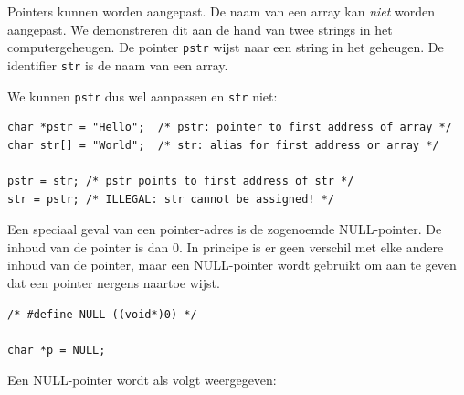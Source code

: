 \documentclass[a4paper,10pt,fleqn,twoside]{article}
\begin{document}
Pointers kunnen worden aangepast. De naam van een array kan \textsl{niet} worden aangepast. We demonstreren dit aan de hand van twee strings in het computergeheugen. De pointer \lstinline|pstr| wijst naar een string in het geheugen. De identifier \lstinline|str| is de naam van een array.

\begin{figure}[!ht]
\centering
{}
\end{figure}

We kunnen \lstinline|pstr| dus wel aanpassen en \lstinline|str| niet:

\begin{lstlisting}
char *pstr = "Hello";  /* pstr: pointer to first address of array */
char str[] = "World";  /* str: alias for first address or array */

pstr = str; /* pstr points to first address of str */
str = pstr; /* ILLEGAL: str cannot be assigned! */
\end{lstlisting}

Een speciaal geval van een pointer-adres is de zogenoemde NULL-pointer. De inhoud van de pointer is dan 0. In principe is er geen verschil met elke andere inhoud van de pointer, maar een NULL-pointer wordt gebruikt om aan te geven dat een pointer nergens naartoe wijst.

\begin{lstlisting}
/* #define NULL ((void*)0) */

char *p = NULL;
\end{lstlisting}

Een NULL-pointer wordt als volgt weergegeven:

\begin{figure}[!ht]
\centering
{}
\end{figure}
\end{document}
